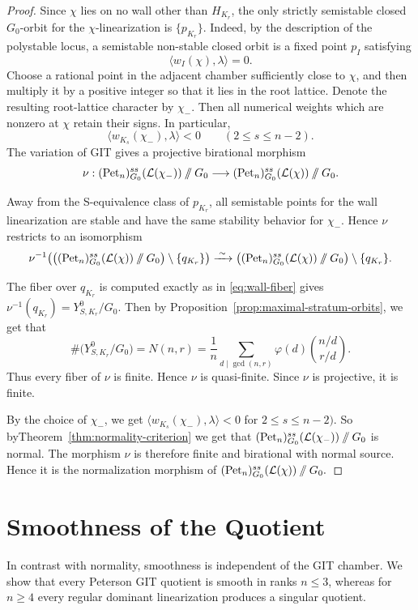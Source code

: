 \documentclass[12pt, reqno]{amsart}
\newcommand{\sslash}{\mathbin{/\mkern-6mu/}}
\theoremstyle{plain}
\numberwithin{equation}{section}
\theoremstyle{definition}
\begin{document}
\begin{proof}
Since \(\chi\) lies on no wall other than \(H_{K_r}\), the only
strictly semistable closed \(G_0\)-orbit for the
\(\chi\)-linearization is $\{p_{K_r}\}.$
Indeed, by the description of the polystable locus, a semistable
non-stable closed orbit is a fixed point \(p_I\) satisfying
\[
\langle w_I(\chi),\lambda\rangle=0.
\]
Choose a rational point in the adjacent chamber sufficiently close to
\(\chi\), and then multiply it by a positive integer so that it lies
in the root lattice. Denote the resulting root-lattice character by
\(\chi_-\). Then all numerical
weights which are nonzero at \(\chi\) retain their signs. In
particular,
\[
\langle w_{K_s}(\chi_-),\lambda\rangle<0
\qquad
(2\le s\le n-2).
\]
The variation of GIT gives a projective birational morphism
\[
\nu:
(\mathrm{Pet}_n)^{ss}_{G_0}(\mathcal L(\chi_-))
\sslash G_0
\longrightarrow
(\mathrm{Pet}_n)^{ss}_{G_0}(\mathcal L(\chi))
\sslash G_0.
\]

Away from the S-equivalence class of \(p_{K_r}\), all semistable
points for the wall linearization are stable and have the same
stability behavior for \(\chi_-\). Hence \(\nu\) restricts to an
isomorphism
\[
\nu^{-1}\!\left(
\left(
(\mathrm{Pet}_n)^{ss}_{G_0}(\mathcal L(\chi))
\sslash G_0
\right)\setminus\{q_{K_r}\}
\right)
\xrightarrow{\;\sim\;}
\left(
(\mathrm{Pet}_n)^{ss}_{G_0}(\mathcal L(\chi))
\sslash G_0
\right)\setminus\{q_{K_r}\}.
\]

The fiber over \(q_{K_r}\) is computed exactly as in
\eqref{eq:wall-fiber} gives $\nu^{-1}(q_{K_r})
=
Y^0_{S,K_r}/G_0.$
Then by Proposition~\ref{prop:maximal-stratum-orbits}, we get that 
\[
\#\bigl(Y^0_{S,K_r}/G_0\bigr)
=
N(n,r)
=
\frac1n
\sum_{d\mid\gcd(n,r)}
\varphi(d)
\binom{n/d}{r/d}.
\]
Thus every fiber of \(\nu\) is finite. Hence \(\nu\) is
quasi-finite. Since \(\nu\) is projective, it is finite.

By the choice of \(\chi_-\), we get $\langle w_{K_s}(\chi_-),\lambda\rangle<0$ for $2\le s\le n-2)$. So byTheorem~\ref{thm:normality-criterion} we get that $(\mathrm{Pet}_n)^{ss}_{G_0}(\mathcal L(\chi_-))
\sslash G_0$
is normal. The morphism \(\nu\) is therefore finite and birational
with normal source. Hence it is the normalization morphism of $(\mathrm{Pet}_n)^{ss}_{G_0}(\mathcal L(\chi))
\sslash G_0.$
\end{proof}


\section{Smoothness of the Quotient}
In contrast with normality, smoothness is independent of the GIT
chamber. We show that every Peterson GIT quotient is smooth in ranks
\(n\le3\), whereas for \(n\ge4\) every regular dominant
linearization produces a singular quotient. 
\end{document}

